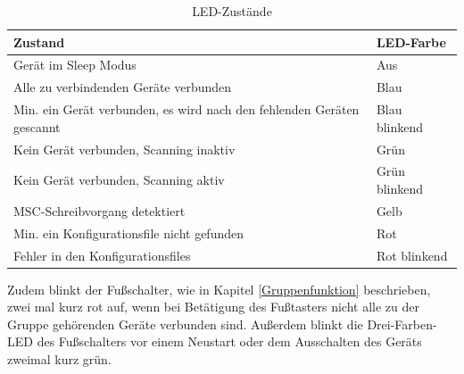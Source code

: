 \begin{table}[H]
	\centering
	\begin{tabular}[H]{l|l}
		Zustand & \ac{LED}-Farbe \\
		\hline
		Gerät im Sleep Modus & Aus \\
		\hline
		Alle zu verbindenden Geräte verbunden & Blau \\
		\hline
		Min. ein Gerät verbunden, es wird nach den fehlenden Geräten gescannt & Blau blinkend \\
		\hline
		Kein Gerät verbunden, Scanning inaktiv & Grün \\
		\hline
		Kein Gerät verbunden, Scanning aktiv & Grün blinkend \\
		\hline
		\ac{MSC}-Schreibvorgang detektiert & Gelb \\
		\hline
		Min. ein Konfigurationsfile nicht gefunden & Rot \\
		\hline
		Fehler in den Konfigurationsfiles & Rot blinkend \\
	\end{tabular}
	\caption{LED-Zustände}
\end{table}

Zudem blinkt der Fußschalter, wie in Kapitel \ref{Gruppenfunktion} beschrieben, zwei mal kurz rot auf, wenn bei Betätigung des Fußtasters nicht alle zu der Gruppe gehörenden Geräte verbunden sind. Außerdem blinkt die Drei-Farben-\ac{LED} des Fußschalters vor einem Neustart oder dem Ausschalten des Geräts zweimal kurz grün.
